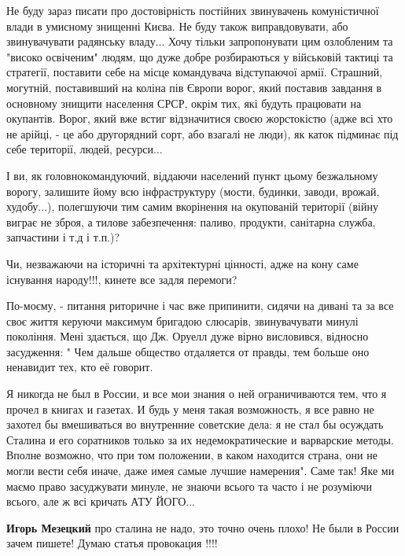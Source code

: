 \begin{itemize}
\begin{itemize}
\begin{itemize}
Не буду зараз писати про достовірність постійних звинувачень комуністичної
влади в умисному знищенні Києва. Не буду також виправдовувати, або
звинувачувати радянську владу... Хочу тільки запропонувати цим озлобленим та
"високо освіченим" людям, що дуже добре розбираються у військовій тактиці та
стратегії, поставити себе на місце командувача відступаючої армії. Страшний,
могутній, поставивший на коліна пів Європи ворог, який поставив завдання в
основному знищити населення СРСР, окрім тих, які будуть працювати на окупантів.
Ворог, який вже встиг відзначитися своєю жорстокістю (адже всі хто не арійці, -
це або другорядний сорт, або взагалі не люди), як каток підминає під себе
території, людей, ресурси... 

І ви, як головнокомандуючий, віддаючи населений
пункт цьому безжальному ворогу, залишите йому всю інфраструктуру (мости,
будинки, заводи, врожай, худобу...), полегшуючи тим самим вкорінення на
окупованій території (війну виграє не зброя, а тилове забезпечення: паливо,
продукти, санітарна служба, запчастини і т.д і т.п.)? 

Чи, незважаючи на історичні та архітектурні цінності, адже на кону саме
існування народу!!!, кинете все задля перемоги? 

По-моєму, - питання риторичне і час вже припинити, сидячи на дивані та за все
своє життя керуючи максимум бригадою слюсарів, звинувачувати минулі покоління.
Мені здається, що Дж. Оруелл дуже вірно висловився, відносно засудження: " Чем
дальше общество отдаляется от правды, тем больше оно ненавидит тех, кто её
говорит.

Я никогда не был в России, и все мои знания о ней ограничиваются тем, что я
прочел в книгах и газетах. И будь у меня такая возможность, я все равно не
захотел бы вмешиваться во внутренние советские дела: я не стал бы осуждать
Сталина и его соратников только за их недемократические и варварские методы.
Вполне возможно, что при том положении, в каком находится страна, они не могли
вести себя иначе, даже имея самые лучшие намерения". Саме так! Яке ми маємо
право засуджувати минуле, не знаючи всього та часто і не розуміючи всього, але
ж всі кричать АТУ ЙОГО...

 
\textbf{Игорь Мезецкий} про сталина не надо, это точно очень плохо! Не были в России зачем пишете!
Думаю статья провокация !!!!



\end{itemize}
\end{itemize}
\end{itemize}

